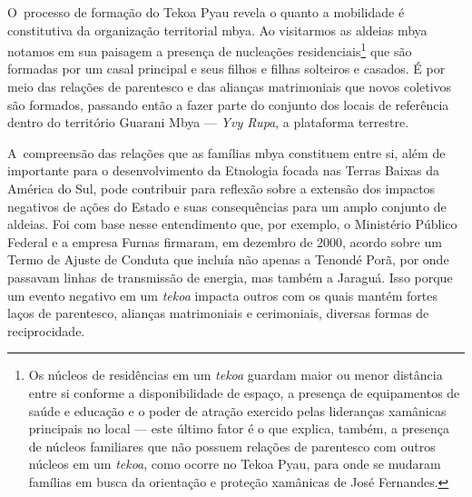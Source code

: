 O~processo de formação do Tekoa Pyau revela o quanto a mobilidade é
constitutiva da organização territorial mbya. Ao visitarmos as aldeias
mbya notamos em sua paisagem a presença de nucleações
residenciais\footnote{Os núcleos de residências em um \emph{tekoa} guardam
maior ou menor distância entre si conforme a disponibilidade de espaço,
a presença de equipamentos de saúde e educação e o poder de atração
exercido pelas lideranças xamânicas principais no local --- este último
fator é o que explica, também, a presença de núcleos familiares que não
possuem relações de parentesco com outros núcleos em um \emph{tekoa}, como
ocorre no Tekoa Pyau, para onde se mudaram famílias em busca da
orientação e proteção xamânicas de José Fernandes.} que são formadas
por um casal principal e seus filhos e filhas solteiros e casados. É
por meio das relações de parentesco e das alianças matrimoniais que
novos coletivos são formados, passando então a fazer parte do conjunto
dos locais de referência dentro do território Guarani Mbya --- \emph{Yvy Rupa},
a plataforma terrestre.

A~compreensão das relações que as famílias mbya constituem entre si,
além de importante para o desenvolvimento da Etnologia focada nas
Terras Baixas da América do Sul, pode contribuir para reflexão sobre a
extensão dos impactos negativos de ações do Estado e suas consequências
para um amplo conjunto de aldeias. Foi com base nesse entendimento que,
por exemplo, o Ministério Público Federal e a empresa Furnas firmaram,
em dezembro de 2000, acordo sobre um Termo de Ajuste de Conduta que
incluía não apenas a  Tenondé Porã, por onde passavam linhas de
transmissão de energia, mas também a  Jaraguá. Isso porque um evento
negativo em um \emph{tekoa} impacta outros com os quais mantém fortes laços de
parentesco, alianças matrimoniais e cerimoniais, diversas formas de
reciprocidade.

